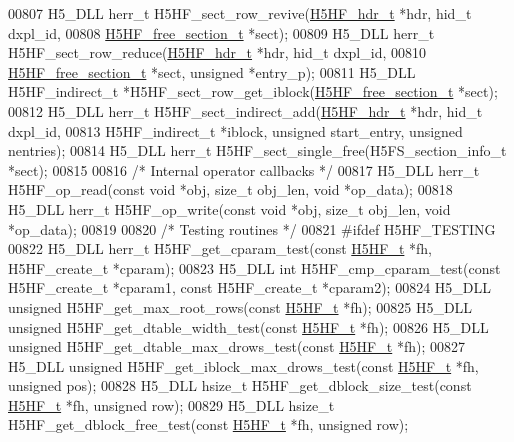 \begin{DoxyCode}
00807 H5\_DLL herr\_t H5HF\_sect\_row\_revive(\hyperlink{struct_h5_h_f__hdr__t}{H5HF\_hdr\_t} *hdr, hid\_t dxpl\_id,
00808     \hyperlink{struct_h5_h_f__free__section__t}{H5HF\_free\_section\_t} *sect);
00809 H5\_DLL herr\_t H5HF\_sect\_row\_reduce(\hyperlink{struct_h5_h_f__hdr__t}{H5HF\_hdr\_t} *hdr, hid\_t dxpl\_id,
00810     \hyperlink{struct_h5_h_f__free__section__t}{H5HF\_free\_section\_t} *sect, \textcolor{keywordtype}{unsigned} *entry\_p);
00811 H5\_DLL H5HF\_indirect\_t *H5HF\_sect\_row\_get\_iblock(\hyperlink{struct_h5_h_f__free__section__t}{H5HF\_free\_section\_t} *sect);
00812 H5\_DLL herr\_t H5HF\_sect\_indirect\_add(\hyperlink{struct_h5_h_f__hdr__t}{H5HF\_hdr\_t} *hdr, hid\_t dxpl\_id,
00813     H5HF\_indirect\_t *iblock, \textcolor{keywordtype}{unsigned} start\_entry, \textcolor{keywordtype}{unsigned} nentries);
00814 H5\_DLL herr\_t H5HF\_sect\_single\_free(H5FS\_section\_info\_t *sect);
00815 
00816 \textcolor{comment}{/* Internal operator callbacks */}
00817 H5\_DLL herr\_t H5HF\_op\_read(\textcolor{keyword}{const} \textcolor{keywordtype}{void} *obj, \textcolor{keywordtype}{size\_t} obj\_len, \textcolor{keywordtype}{void} *op\_data);
00818 H5\_DLL herr\_t H5HF\_op\_write(\textcolor{keyword}{const} \textcolor{keywordtype}{void} *obj, \textcolor{keywordtype}{size\_t} obj\_len, \textcolor{keywordtype}{void} *op\_data);
00819 
00820 \textcolor{comment}{/* Testing routines */}
00821 \textcolor{preprocessor}{#ifdef H5HF\_TESTING}
00822 H5\_DLL herr\_t H5HF\_get\_cparam\_test(\textcolor{keyword}{const} \hyperlink{struct_h5_h_f__t}{H5HF\_t} *fh, H5HF\_create\_t *cparam);
00823 H5\_DLL \textcolor{keywordtype}{int} H5HF\_cmp\_cparam\_test(\textcolor{keyword}{const} H5HF\_create\_t *cparam1, \textcolor{keyword}{const} H5HF\_create\_t *cparam2);
00824 H5\_DLL \textcolor{keywordtype}{unsigned} H5HF\_get\_max\_root\_rows(\textcolor{keyword}{const} \hyperlink{struct_h5_h_f__t}{H5HF\_t} *fh);
00825 H5\_DLL \textcolor{keywordtype}{unsigned} H5HF\_get\_dtable\_width\_test(\textcolor{keyword}{const} \hyperlink{struct_h5_h_f__t}{H5HF\_t} *fh);
00826 H5\_DLL \textcolor{keywordtype}{unsigned} H5HF\_get\_dtable\_max\_drows\_test(\textcolor{keyword}{const} \hyperlink{struct_h5_h_f__t}{H5HF\_t} *fh);
00827 H5\_DLL \textcolor{keywordtype}{unsigned} H5HF\_get\_iblock\_max\_drows\_test(\textcolor{keyword}{const} \hyperlink{struct_h5_h_f__t}{H5HF\_t} *fh, \textcolor{keywordtype}{unsigned} pos);
00828 H5\_DLL hsize\_t H5HF\_get\_dblock\_size\_test(\textcolor{keyword}{const} \hyperlink{struct_h5_h_f__t}{H5HF\_t} *fh, \textcolor{keywordtype}{unsigned} row);
00829 H5\_DLL hsize\_t H5HF\_get\_dblock\_free\_test(\textcolor{keyword}{const} \hyperlink{struct_h5_h_f__t}{H5HF\_t} *fh, \textcolor{keywordtype}{unsigned} row);

\end{DoxyCode}
